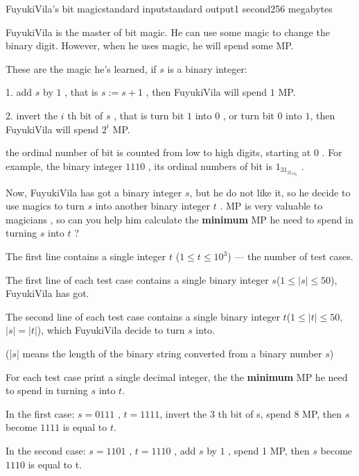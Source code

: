 \begin{problem}{FuyukiVila's bit magic}{standard input}{standard output}{1 second}{256 megabytes}

    FuyukiVila is the master of bit magic. He can use some magic to change the binary digit.  However, when he uses magic, he will spend some MP.
    
    These are the magic he's learned, if $s$ is a binary integer:
    
    1. add $s$ by $1$ , that is $s := s + 1$ , then FuyukiVila will spend $1$ MP.
    
    2. invert the $i$ th  bit of $s$ ,  that is turn bit $1$ into $0$ , or turn bit $0$ into $1$, then FuyukiVila will spend $2^i$ MP.
    
    the ordinal number of bit is counted from low to high digits, starting at $0$ . For example, the binary integer $1110$ , its ordinal numbers of bit is $1_31_21_10_0$ .
    
    Now, FuyukiVila has got a binary integer $s$, but he do not like it, so he decide to use magics to turn $s$ into another binary integer $t$ . MP is very valuable to magicians , so can you help him calculate the \textbf{minimum} MP he need to spend in turning $s$ into $t$ ?
    
    \InputFile
    The first line contains a single integer $t$ ($1 \le t \le 10^3$) --- the number of test cases.
    
    The first line of each test case contains a single binary integer $s$($1\leq |s| \leq 50$), FuyukiVila has got.
    
    The second line of each test case contains a single binary integer $t$($1\leq |t| \leq 50$, $|s| = |t|$), which FuyukiVila decide to turn $s$ into.
    
    (|$s$| means the length of the binary string converted from a binary number $s$)
    
    \OutputFile
    For each test case print a single decimal integer, the the \textbf{minimum} MP he need to spend in turning $s$ into $t$.
    
    \Example
    
    \begin{example}
    \end{example}
    
    \Note
    In the first case: $s = 0111$ , $t = 1111$, invert the $3$ th bit of s, spend 8 MP, then $s$ become $1111$ is equal to $t$.
    
    In the second case: $s = 1101$ , $t = 1110$ , add $s$ by $1$ , spend 1 MP, then $s$ become $1110$ is equal to t.
    
    \end{problem}